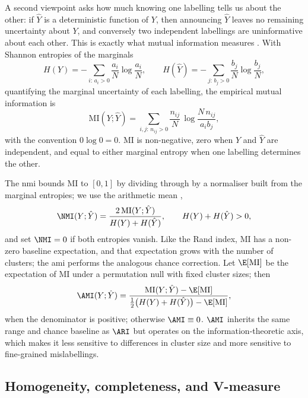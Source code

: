A second viewpoint asks how much knowing one labelling tells us about the other: if $\hat{Y}$ is a deterministic function of $Y$, then announcing $\hat{Y}$ leaves no remaining uncertainty about $Y$, and conversely two independent labellings are uninformative about each other.
This is exactly what mutual information measures \parencite{vinh2010information}.
With Shannon entropies of the marginals
\begin{equation}\label{eq:method:entropy_marginals}
  H(Y)=-\sum_{i:\,a_i>0}\frac{a_i}{N}\log\frac{a_i}{N},
  \qquad
  H(\hat{Y})=-\sum_{j:\,b_j>0}\frac{b_j}{N}\log\frac{b_j}{N},
\end{equation}
quantifying the marginal uncertainty of each labelling, the empirical mutual information is
\begin{equation}\label{eq:method:mi}
  \mathrm{MI}(Y;\hat{Y})
  =
  \sum_{i,j:\,n_{ij}>0}\frac{n_{ij}}{N}\,
  \log\frac{N\,n_{ij}}{a_i b_j},
\end{equation}
with the convention $0\log 0=0$.
$\mathrm{MI}$ is non-negative, zero when $Y$ and $\hat{Y}$ are independent, and equal to either marginal entropy when one labelling determines the other.

The \gls{nmi} bounds $\mathrm{MI}$ to $[0,1]$ by dividing through by a normaliser built from the marginal entropies; we use the arithmetic mean \parencite{vinh2010information},
\begin{equation}\label{eq:method:nmi}
  \NMI(Y;\hat{Y})
  =
  \frac{2\,\mathrm{MI}(Y;\hat{Y})}{H(Y)+H(\hat{Y})},
  \qquad H(Y)+H(\hat{Y})>0,
\end{equation}
and set $\NMI=0$ if both entropies vanish.
Like the Rand index, $\mathrm{MI}$ has a non-zero baseline expectation, and that expectation grows with the number of clusters; the \gls{ami} \parencite{vinh2010information} performs the analogous chance correction.
Let $\E[\mathrm{MI}]$ be the expectation of $\mathrm{MI}$ under a permutation null with fixed cluster sizes; then
\begin{equation}\label{eq:method:ami}
  \AMI(Y;\hat{Y})
  =
  \frac{\mathrm{MI}(Y;\hat{Y})-\E[\mathrm{MI}]}{\tfrac{1}{2}\bigl(H(Y)+H(\hat{Y})\bigr)-\E[\mathrm{MI}]},
\end{equation}
when the denominator is positive; otherwise $\AMI\equiv 0$.
$\AMI$ inherits the same range and chance baseline as $\ARI$ but operates on the information-theoretic axis, which makes it less sensitive to differences in cluster size and more sensitive to fine-grained mislabellings.

\subsection*{Homogeneity, completeness, and V-measure}

